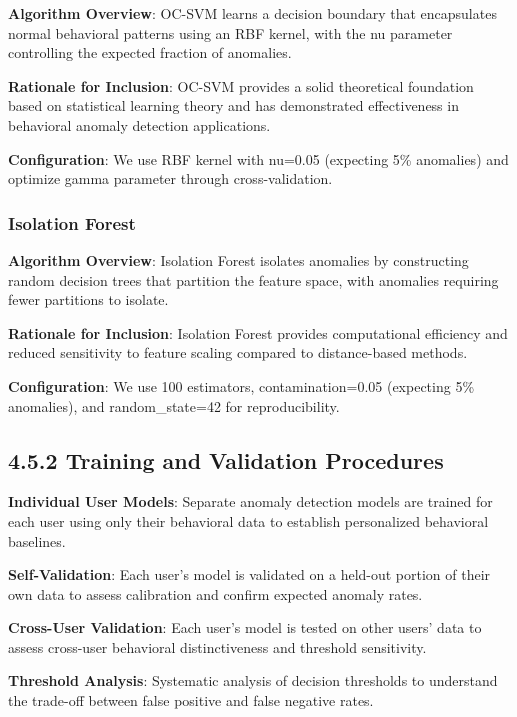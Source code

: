 \documentclass[
  12pt,
  a4paper,
]{report}
\begin{document}
\textbf{Algorithm Overview}: OC-SVM learns a decision boundary that
encapsulates normal behavioral patterns using an RBF kernel, with the nu
parameter controlling the expected fraction of anomalies.

\textbf{Rationale for Inclusion}: OC-SVM provides a solid theoretical
foundation based on statistical learning theory and has demonstrated
effectiveness in behavioral anomaly detection applications.

\textbf{Configuration}: We use RBF kernel with nu=0.05 (expecting 5\%
anomalies) and optimize gamma parameter through cross-validation.

\subsubsection{Isolation Forest}\label{isolation-forest}

\textbf{Algorithm Overview}: Isolation Forest isolates anomalies by
constructing random decision trees that partition the feature space,
with anomalies requiring fewer partitions to isolate.

\textbf{Rationale for Inclusion}: Isolation Forest provides
computational efficiency and reduced sensitivity to feature scaling
compared to distance-based methods.

\textbf{Configuration}: We use 100 estimators, contamination=0.05
(expecting 5\% anomalies), and random\_state=42 for reproducibility.

\subsection{4.5.2 Training and Validation
Procedures}\label{training-and-validation-procedures-1}

\textbf{Individual User Models}: Separate anomaly detection models are
trained for each user using only their behavioral data to establish
personalized behavioral baselines.

\textbf{Self-Validation}: Each user's model is validated on a held-out
portion of their own data to assess calibration and confirm expected
anomaly rates.

\textbf{Cross-User Validation}: Each user's model is tested on other
users' data to assess cross-user behavioral distinctiveness and
threshold sensitivity.

\textbf{Threshold Analysis}: Systematic analysis of decision thresholds
to understand the trade-off between false positive and false negative
rates.
\end{document}
